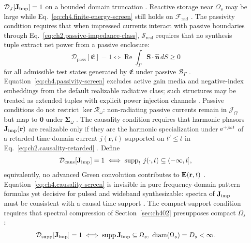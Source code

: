 \(\mathcal{D}_{J}[\mathbf{J}_{\mathrm{imp}}]=1\) on a bounded domain truncation \cite{stratton1941}. Reactive storage
near \(\Omega_{s}\) may be large while Eq.~\eqref{eq:ch4.finite-energy-screen} still holds on
\(\mathcal{F}_{\mathrm{rad}}\) \cite{harrington2001}.
The passivity condition requires that when impressed currents interact with passive boundaries through
Eq.~\eqref{eq:ch2.passive-impedance-class}, $\mathcal{S}_{\mathrm{real}}$ requires that no synthesis tuple extract
net power from a passive enclosure:
\begin{equation}
\label{eq:ch4.passivity-screen}
\mathcal{D}_{\mathrm{pass}}[\mathfrak{E}]
=
1
\iff
\operatorname{Re}\!\int_{\Gamma}
\mathbf{S}\cdot\hat{\mathbf{n}}\,dS
\ge 0
\end{equation}
for all admissible test states generated by \(\mathfrak{E}\) under passive \(\mathcal{B}_\Gamma\)
\cite{harrington2001}. Equation~\eqref{eq:ch4.passivity-screen} excludes active
gain media and negative-index embeddings from the default realizable radiative class; such structures may
be treated as extended tuples with explicit power injection channels \cite{harrington2001}. Passive
conditions do not restrict \(\ker\mathcal{R}_\omega\): non-radiating passive currents remain in
\(\mathcal{J}_\Omega\) but map to \(\mathbf{0}\) under \(\boldsymbol{\Sigma}_\omega\)
\cite{stratton1941}.
The causality condition requires that harmonic phasors \(\mathbf{J}_{\mathrm{imp}}(\mathbf{r})\) are realizable only if they are the harmonic
specialization under $\mathrm{e}^{+\mathrm{j}\omega t}$ of a retarded time-domain current \(j(\mathbf{r},t)\) supported on \(t'\le t\) in
Eq.~\eqref{eq:ch2.causality-retarded} \cite{stratton1941}. Define
\begin{equation}
\label{eq:ch4.causality-screen}
\mathcal{D}_{\mathrm{caus}}[\mathbf{J}_{\mathrm{imp}}]
=
1
\iff
\operatorname{supp}_{t}\,j(\cdot,t)\subseteq(-\infty,t],
\end{equation}
equivalently, no advanced Green convolution contributes to \(\mathbf{E}(\mathbf{r},t)\)
\cite{stratton1941}. Equation~\eqref{eq:ch4.causality-screen} is invisible in pure frequency-domain
pattern formulas yet decisive for pulsed and wideband synthesizable: spectra of \(\mathbf{J}_{\mathrm{imp}}\) must be
consistent with a causal time support \cite{jackson1999}.
The compact-support condition requires that spectral compression of Section~\ref{sec:ch402} presupposes compact \(\Omega_{s}\):
\begin{equation}
\label{eq:ch4.support-screen}
\mathcal{D}_{\mathrm{supp}}[\mathbf{J}_{\mathrm{imp}}]
=
1
\iff
\operatorname{supp}\mathbf{J}_{\mathrm{imp}}\subseteq\Omega_{s},\
\operatorname{diam}(\Omega_{s})=D_{s}<\infty.
\end{equation}
